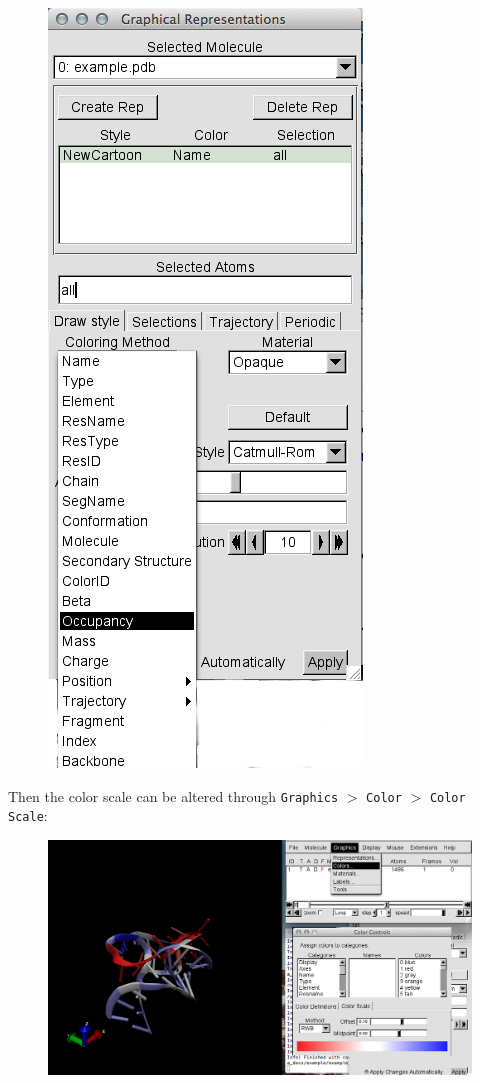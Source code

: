 \documentclass[12pt]{article}
\begin{document}
\begin{figure} [h!]
\begin{center}
{\includegraphics[scale=0.3]{pictures/vmd5.png}}
\end{center}
\end{figure} 
\newpage
Then the color scale can be altered through \texttt{Graphics} $>$ \texttt{Color} $>$ \texttt{Color Scale}:

\begin{figure}[h!]
\centering
\includegraphics[scale=0.4]{./pictures/vmd6.png}
\end{figure}
\end{document}
